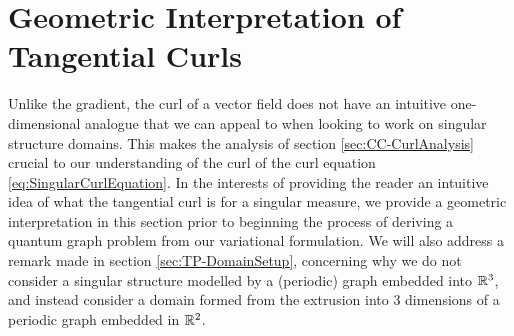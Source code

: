 \section{Geometric Interpretation of Tangential Curls} \label{sec:CC-Geometric}
Unlike the gradient, the curl of a vector field does not have an intuitive one-dimensional analogue that we can appeal to when looking to work on singular structure domains.
This makes the analysis of section \ref{sec:CC-CurlAnalysis} crucial to our understanding of the curl of the curl equation \eqref{eq:SingularCurlEquation}.
In the interests of providing the reader an intuitive idea of what the tangential curl is for a singular measure, we provide a geometric interpretation in this section prior to beginning the process of deriving a quantum graph problem from our variational formulation.
We will also address a remark made in section \ref{sec:TP-DomainSetup}, concerning why we do not consider a singular structure modelled by a (periodic) graph embedded into $\mathbb{R}^3$, and instead consider a domain formed from the extrusion into 3 dimensions of a periodic graph embedded in $\mathbb{R}^2$.

